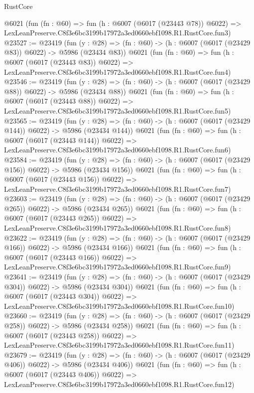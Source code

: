 \begin{lexlean}{RustCore}
\begin{coremodule}
    @6021
    (fun (fn : @60) =>
    fun (h : @6007 (@6017 (@23443 @78)) @6022) =>
    LexLeanPreserve.C8f3e6bc3199b17972a3ed0660ebf1098.R1.RustCore.fun3)
@23527 := @23419
    (fun (y : @28) => (fn : @60) -> (h : @6007 (@6017 (@23429 @83)) @6022) -> @5986 (@23434 @83))
    @6021
    (fun (fn : @60) =>
    fun (h : @6007 (@6017 (@23443 @83)) @6022) =>
    LexLeanPreserve.C8f3e6bc3199b17972a3ed0660ebf1098.R1.RustCore.fun4)
@23546 := @23419
    (fun (y : @28) => (fn : @60) -> (h : @6007 (@6017 (@23429 @88)) @6022) -> @5986 (@23434 @88))
    @6021
    (fun (fn : @60) =>
    fun (h : @6007 (@6017 (@23443 @88)) @6022) =>
    LexLeanPreserve.C8f3e6bc3199b17972a3ed0660ebf1098.R1.RustCore.fun5)
@23565 := @23419
    (fun (y : @28) => (fn : @60) -> (h : @6007 (@6017 (@23429 @144)) @6022) -> @5986 (@23434 @144))
    @6021
    (fun (fn : @60) =>
    fun (h : @6007 (@6017 (@23443 @144)) @6022) =>
    LexLeanPreserve.C8f3e6bc3199b17972a3ed0660ebf1098.R1.RustCore.fun6)
@23584 := @23419
    (fun (y : @28) => (fn : @60) -> (h : @6007 (@6017 (@23429 @156)) @6022) -> @5986 (@23434 @156))
    @6021
    (fun (fn : @60) =>
    fun (h : @6007 (@6017 (@23443 @156)) @6022) =>
    LexLeanPreserve.C8f3e6bc3199b17972a3ed0660ebf1098.R1.RustCore.fun7)
@23603 := @23419
    (fun (y : @28) => (fn : @60) -> (h : @6007 (@6017 (@23429 @265)) @6022) -> @5986 (@23434 @265))
    @6021
    (fun (fn : @60) =>
    fun (h : @6007 (@6017 (@23443 @265)) @6022) =>
    LexLeanPreserve.C8f3e6bc3199b17972a3ed0660ebf1098.R1.RustCore.fun8)
@23622 := @23419
    (fun (y : @28) => (fn : @60) -> (h : @6007 (@6017 (@23429 @166)) @6022) -> @5986 (@23434 @166))
    @6021
    (fun (fn : @60) =>
    fun (h : @6007 (@6017 (@23443 @166)) @6022) =>
    LexLeanPreserve.C8f3e6bc3199b17972a3ed0660ebf1098.R1.RustCore.fun9)
@23641 := @23419
    (fun (y : @28) => (fn : @60) -> (h : @6007 (@6017 (@23429 @304)) @6022) -> @5986 (@23434 @304))
    @6021
    (fun (fn : @60) =>
    fun (h : @6007 (@6017 (@23443 @304)) @6022) =>
    LexLeanPreserve.C8f3e6bc3199b17972a3ed0660ebf1098.R1.RustCore.fun10)
@23660 := @23419
    (fun (y : @28) => (fn : @60) -> (h : @6007 (@6017 (@23429 @258)) @6022) -> @5986 (@23434 @258))
    @6021
    (fun (fn : @60) =>
    fun (h : @6007 (@6017 (@23443 @258)) @6022) =>
    LexLeanPreserve.C8f3e6bc3199b17972a3ed0660ebf1098.R1.RustCore.fun11)
@23679 := @23419
    (fun (y : @28) => (fn : @60) -> (h : @6007 (@6017 (@23429 @406)) @6022) -> @5986 (@23434 @406))
    @6021
    (fun (fn : @60) =>
    fun (h : @6007 (@6017 (@23443 @406)) @6022) =>
    LexLeanPreserve.C8f3e6bc3199b17972a3ed0660ebf1098.R1.RustCore.fun12)

\end{coremodule}
\end{lexlean}
